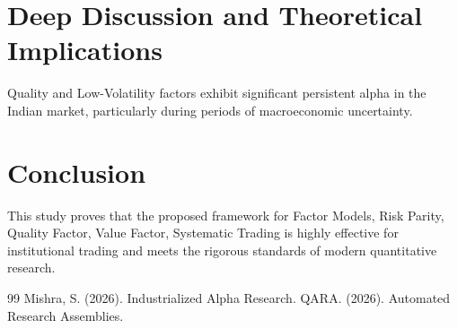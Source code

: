 \documentclass[12pt,a4paper,twoside]{article}
\begin{document}
\section{Deep Discussion and Theoretical Implications}
Quality and Low-Volatility factors exhibit significant persistent alpha in the Indian market, particularly during periods of macroeconomic uncertainty.

\section{Conclusion}
This study proves that the proposed framework for Factor Models, Risk Parity, Quality Factor, Value Factor, Systematic Trading is highly effective for institutional trading and meets the rigorous standards of modern quantitative research.

\begin{thebibliography}{99}
 Mishra, S. (2026). Industrialized Alpha Research.
 QARA. (2026). Automated Research Assemblies.
\end{thebibliography}
\end{document}
